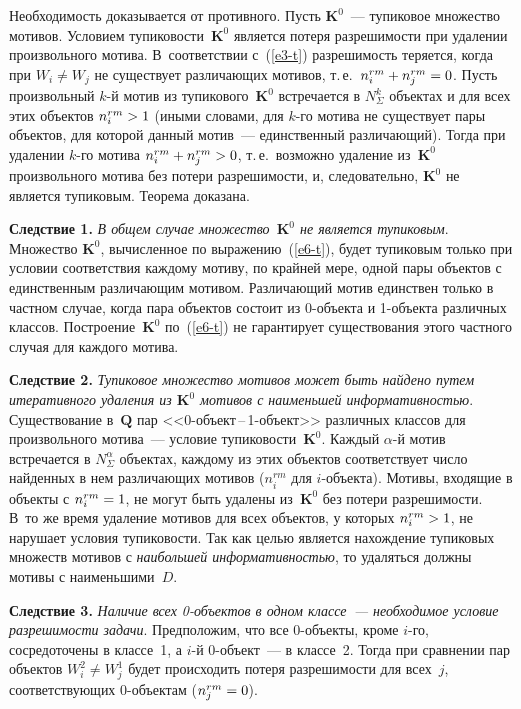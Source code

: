 \begin{multicols}{2}
Необходимость доказывается от противного. Пусть $\mathbf{K}^0$~--- тупиковое
множество мотивов. Условием тупиковости~$\mathbf{K}^0$ является потеря
раз\-ре\-ши\-мости при удалении произвольного мотива. В~соответствии
с~(\ref{e3-t}) разрешимость теряется, когда при $W_i\not=W_j$ не
существует различающих мотивов, т.\,е.\ $n_i^{rm}\hm+n_j^{rm}\hm=0$.
Пусть произвольный $k$-й мотив из тупикового~$\mathbf{K}^0$ встречается в
$N_\Sigma^k$ объектах и для всех этих объектов $n_i^{rm}\hm>1$ (иными
словами, для $k$-го мотива не существует пары объектов, для которой
данный мотив~--- единственный различающий). Тогда при удалении $k$-го
мотива $n_i^{rm}\hm+n_j^{rm}\hm>0$, т.\,е.\ возможно удаление из~$\mathbf{K}^0$
произвольного мотива без потери разрешимости, и, следовательно, $\mathbf{K}^0$ не
является тупиковым. Теорема доказана.

\medskip

\noindent
\textbf{Следствие 1.}
\textit{В общем случае множество~$\mathbf{K}^0$ не является тупиковым}.
Множество $\mathbf{K}^0$,
вычисленное по выражению~(\ref{e6-t}), будет тупиковым только при
условии соответствия каждому мотиву, по крайней мере, одной пары
объектов с единственным различающим мотивом. Различающий мотив
единствен только в частном случае, когда пара объектов состоит из
0-объек\-та и 1-объек\-та различных классов. Построение~$\mathbf{K}^0$
по~(\ref{e6-t}) не гарантирует существования этого частного случая для
каждого мотива.

\medskip

\noindent
\textbf{Следствие 2.}
\textit{Тупиковое множество мотивов может быть найдено путем
итеративного удаления из $\mathbf{K}^0$ мотивов с наименьшей
информативностью}. Существование в~$\mathbf{Q}$ пар
<<0-объект\,--\,1-объект>> различных классов для произвольного
мотива~--- условие тупиковости~$\mathbf{K}^0$. Каждый $\alpha$-й мотив
встречается в $N_\Sigma^\alpha$ объектах, каждому из этих объектов
соответствует число найденных в нем различающих мотивов ($n_i^{rm}$ для
$i$-объек\-та). Мотивы, входящие в объекты с $n_i^{rm}\hm =1$, не могут
быть удалены из~$\mathbf{K}^0$ без потери разрешимости. В~то же время удаление
мотивов для всех объектов, у которых $n_i^{rm}\hm>1$, не нарушает
условия тупиковости. Так как целью является на\-хож\-де\-ние тупиковых
множеств мотивов с \textit{наибольшей информативностью}, то удаляться
должны мотивы с наименьшими~$D$.

\medskip

\noindent
\textbf{Следствие 3.}
\textit{Наличие всех 0-объектов в одном классе~--- необходимое условие
разрешимости задачи}. Предположим, что все 0-объек\-ты, кроме $i$-го,
сосредоточены в классе~1, а $i$-й 0-объект~--- в классе~2. Тогда при
сравнении пар объектов $W_i^2\not= W_j^1$ будет происходить потеря
разрешимости для всех~$j$, соответствующих 0-объек\-там
($n_j^{rm}\hm=0$).


\end{multicols}
